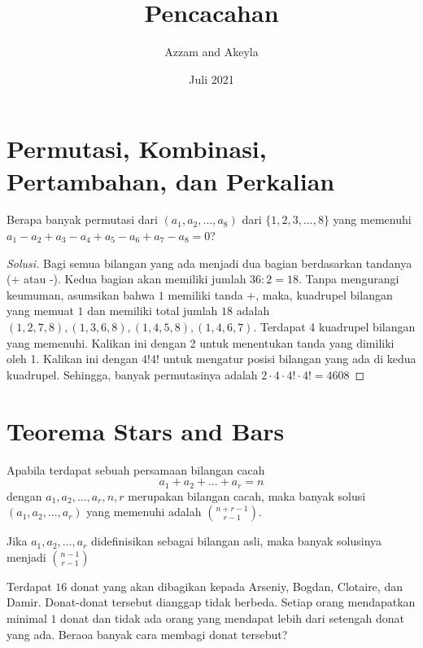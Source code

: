 \documentclass[11pt]{scrartcl}
\title{Pencacahan}
\author{Azzam and Akeyla}
\date{Juli 2021}
\begin{document}
\maketitle

\renewcommand*\contentsname{Daftar Isi}
\tableofcontents

\newpage

\section{Permutasi, Kombinasi, Pertambahan, dan Perkalian}
\begin{example}
    Berapa banyak permutasi dari $(a_1, a_2,..., a_8)$ dari $\{1, 2, 3,..., 8\}$ yang memenuhi $a_1 - a_2 + a_3 - a_4 + a_5 - a_6 + a_7 - a_8 = 0$?
\end{example}

\begin{proof}[Solusi]
     Bagi semua bilangan yang ada menjadi dua bagian berdasarkan tandanya (+ atau -). Kedua bagian akan memiliki jumlah $36 : 2 = 18$. Tanpa mengurangi keumuman, asumsikan bahwa $1$ memiliki tanda $+$, maka, kuadrupel bilangan yang memuat $1$ dan memiliki total jumlah $18$ adalah ${(1, 2, 7, 8), (1, 3, 6, 8), (1, 4, 5, 8), (1, 4, 6, 7)}$. Terdapat 4 kuadrupel bilangan yang memenuhi. Kalikan ini dengan 2 untuk menentukan tanda yang dimiliki oleh 1. Kalikan ini dengan $4!4!$ untuk mengatur posisi bilangan yang ada di kedua kuadrupel. Sehingga, banyak permutasinya adalah $2\cdot 4\cdot 4! \cdot 4! = 4608$
\end{proof}

\section{Teorema Stars and Bars}
\begin{theorem}
     Apabila terdapat sebuah persamaan bilangan cacah \[a_1 + a_2 + ... + a_r = n\] dengan $a_1, a_2,...,a_r, n, r$ merupakan bilangan cacah, maka banyak solusi $(a_1, a_2, ...,a_r)$ yang memenuhi adalah $\binom{n + r - 1}{r - 1}$.
    
    Jika $a_1, a_2, ..., a_r$ didefinisikan sebagai bilangan asli, maka banyak solusinya menjadi $\binom{n - 1}{r - 1}$
\end{theorem}

\begin{example}
     Terdapat $16$ donat yang akan dibagikan kepada Arseniy, Bogdan, Clotaire, dan Damir. Donat-donat tersebut dianggap tidak berbeda. Setiap orang mendapatkan minimal $1$ donat dan tidak ada orang yang mendapat lebih dari setengah donat yang ada. Beraoa banyak cara membagi donat tersebut?
\end{example}
\end{document}
